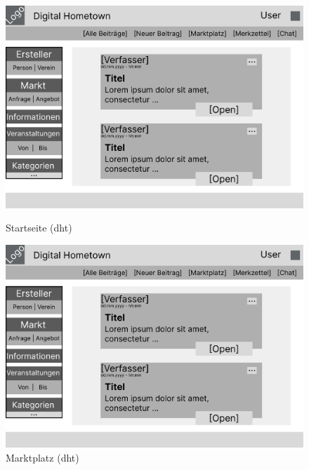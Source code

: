 \begin{figure}[!htb]
    \begin{minipage}[t]{0.5\textwidth}
        \includegraphics[page=2, width=1\textwidth]{figures/jan/wire_example.pdf}
        \caption[Startseite (\acrshort{dht})]{Startseite (\acrshort{dht})}
        \label{fig:Startseite}
    \end{minipage}
    \begin{minipage}[t]{0.5\textwidth}
        \includegraphics[page=1, width=1\textwidth]{figures/jan/wire_example.pdf}
        \caption[Marktplatz (\acrshort{dht})]{Marktplatz (\acrshort{dht})}
        \label{fig:Marktplatz}
    \end{minipage}
\end{figure}
